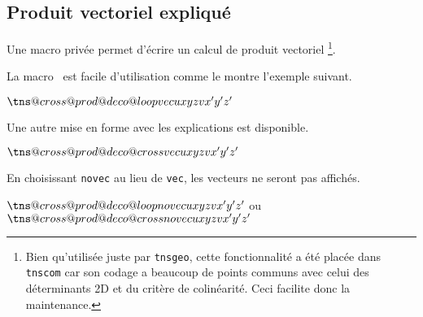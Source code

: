\documentclass[12pt,a4paper]{article}
\begin{document}

\subsection{Produit vectoriel expliqué}

Une macro privée permet d'écrire un calcul de produit vectoriel
\footnote{
	Bien qu'utilisée juste par \texttt{tnsgeo}, cette fonctionnalité a été placée dans \texttt{tnscom} car son codage a beaucoup de points communs avec celui des déterminants 2D et du critère de colinéarité. Ceci facilite donc la maintenance.
}.





La macro  est facile d'utilisation comme le montre l'exemple suivant.

\begin{latexex}
\makeatletter
$\tns@cross@prod@deco@loop%
     {vec}         %
     {u}           %
     {x}{y}{z}     %
     {v}           %
     {x'}{y'}{z'}$ %
\makeatother
\end{latexex}





Une autre mise en forme avec les explications est disponible.

\begin{latexex}
\makeatletter
$\tns@cross@prod@deco@cross%
     {vec}          %
     {u}{x}{y}{z}   %
     {v}{x'}{y'}{z'}$
\makeatother
\end{latexex}





En choisissant \verb+novec+ au lieu de \verb+vec+, les vecteurs ne seront pas affichés.

\begin{latexex}
\makeatletter
$\tns@cross@prod@deco@loop%
     {novec}        %
     {u}{x}{y}{z}   %
     {v}{x'}{y'}{z'}$
ou
$\tns@cross@prod@deco@cross%
     {novec}        %
     {u}{x}{y}{z}   %
     {v}{x'}{y'}{z'}$
\makeatother
\end{latexex}
\end{document}
